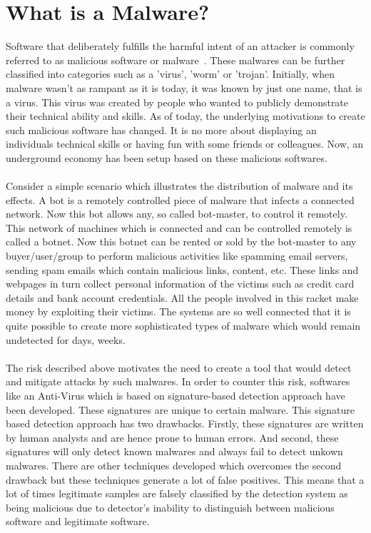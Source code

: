 \documentclass[11pt]{article}
\begin{document}
		\section{What is a Malware?}
	Software that deliberately fulfills the harmful intent of an attacker is commonly referred to as malicious software or malware~\cite{moser2007exploring}. These malwares can be further classified into categories such as a 'virus', 'worm' or 'trojan'. Initially, when malware wasn't as rampant as it is today, it was known by just one name, that is a virus. This virus was created by people who wanted to publicly demonstrate their technical ability and skills. As of today, the underlying motivations to create such malicious software has changed. It is no more about displaying an individuals technical skills or having fun with some friends or colleagues. Now, an underground economy has been setup based on these malicious softwares.\\ \\
	Consider a simple scenario which illustrates the distribution of malware and its effects. A bot is a remotely controlled piece of malware that infects a connected network. Now this bot allows any, so called bot-master, to control it remotely. This network of machines which is connected and can be controlled remotely is called a botnet. Now this botnet can be rented or sold by the bot-master to any buyer/user/group to perform malicious activities like spamming email servers, sending spam emails which contain malicious links, content, etc. These links and webpages in turn collect personal information of the victims such as credit card details and bank account credentials. All the people involved in this racket make money by exploiting their victims. The systems are so well connected that it is quite possible to create more sophisticated types of malware which would remain undetected for days, weeks.\\ \\
	The risk described above motivates the need to create a tool that would detect and mitigate attacks by such malwares. In order to counter this risk, softwares like an Anti-Virus which is based on signature-based detection approach have been developed. These signatures are unique to certain malware. This signature based detection approach has two drawbacks. Firstly, these signatures are written by human analysts and are hence prone to human errors. And second, these signatures will only detect known malwares and always fail to detect unkown malwares.
	There are other techniques developed which overcomes the second drawback but these techniques generate a lot of false positives. This means that a lot of times legitimate samples are falsely classified by the detection system as being malicious due to detector's inability to distinguish between malicious software and legitimate software.
\end{document}
